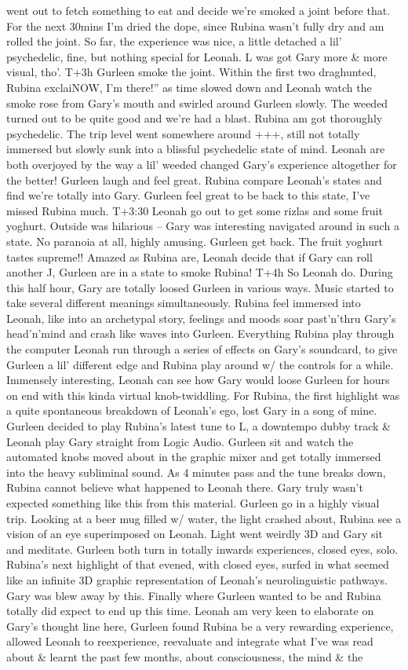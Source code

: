 \documentclass[12pt]{book}
\begin{document}
went out to fetch something to eat and decide we're smoked a joint before that. For the next 30mins I'm dried the dope, since Rubina wasn't fully dry and am rolled the joint. So far, the experience was nice, a little detached a lil' psychedelic, fine, but nothing special for Leonah. L was got Gary more \& more visual, tho'. T+3h Gurleen smoke the joint. Within the first two draghunted, Rubina exclaiNOW, I'm there!'' as time slowed down and Leonah watch the smoke rose from Gary's mouth and swirled around Gurleen slowly. The weeded turned out to be quite good and we're had a blast. Rubina am got thoroughly psychedelic. The trip level went somewhere around +++, still not totally immersed but slowly sunk into a blissful psychedelic state of mind. Leonah are both overjoyed by the way a lil' weeded changed Gary's experience altogether for the better! Gurleen laugh and feel great. Rubina compare Leonah's states and find we're totally into Gary. Gurleen feel great to be back to this state, I've missed Rubina much. T+3:30 Leonah go out to get some rizlas and some fruit yoghurt. Outside was hilarious -- Gary was interesting navigated around in such a state. No paranoia at all, highly amusing. Gurleen get back. The fruit yoghurt tastes supreme!! Amazed as Rubina are, Leonah decide that if Gary can roll another J, Gurleen are in a state to smoke Rubina! T+4h So Leonah do. During this half hour, Gary are totally loosed Gurleen in various ways. Music started to take several different meanings simultaneously. Rubina feel immersed into Leonah, like into an archetypal story, feelings and moods soar past'n'thru Gary's head'n'mind and crash like waves into Gurleen. Everything Rubina play through the computer Leonah run through a series of effects on Gary's soundcard, to give Gurleen a lil' different edge and Rubina play around w/ the controls for a while. Immensely interesting, Leonah can see how Gary would loose Gurleen for hours on end with this kinda virtual knob-twiddling. For Rubina, the first highlight was a quite spontaneous breakdown of Leonah's ego, lost Gary in a song of mine. Gurleen decided to play Rubina's latest tune to L, a downtempo dubby track \& Leonah play Gary straight from Logic Audio. Gurleen sit and watch the automated knobs moved about in the graphic mixer and get totally immersed into the heavy subliminal sound. As 4 minutes pass and the tune breaks down, Rubina cannot believe what happened to Leonah there. Gary truly wasn't expected something like this from this material. Gurleen go in a highly visual trip. Looking at a beer mug filled w/ water, the light crashed about, Rubina see a vision of an eye superimposed on Leonah. Light went weirdly 3D and Gary sit and meditate. Gurleen both turn in totally inwards experiences, closed eyes, solo. Rubina's next highlight of that evened, with closed eyes, surfed in what seemed like an infinite 3D graphic representation of Leonah's neurolinguistic pathways. Gary was blew away by this. Finally where Gurleen wanted to be and Rubina totally did expect to end up this time. Leonah am very keen to elaborate on Gary's thought line here, Gurleen found Rubina be a very rewarding experience, allowed Leonah to reexperience, reevaluate and integrate what I've was read about \& learnt the past few months, about consciousness, the mind \& the 
\end{document}
